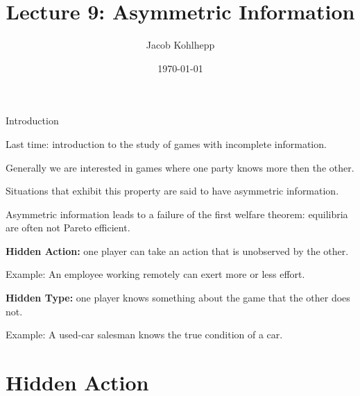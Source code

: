 \documentclass[aspectratio=169]{beamer}
\title[Asymmetric]{Lecture 9: Asymmetric Information} %
\author{Jacob Kohlhepp} %
\institute[UCLA] %
{
Econ 101 \\ %
\medskip
}
\date{\today} %
\newenvironment{wideitemize}{\itemize\addtolength{\itemsep}{10pt}}{\enditemize}
\begin{document}
\begin{frame}
\titlepage %
\end{frame}

\begin{frame}{Introduction}
\begin{wideitemize}
    \item Last time: introduction to the study of games with incomplete information.
    \item Generally we are interested in games where one party knows more then the other.
    \item Situations that exhibit this property are said to have asymmetric information.
    \item Asymmetric information leads to a failure of the first welfare theorem: equilibria are often not Pareto efficient.
    \item \textbf{Hidden Action: } one player can take an action that is unobserved by the other.
    \begin{wideitemize}
        \item Example: An employee working remotely can exert more or less effort.
    \end{wideitemize}
    \item \textbf{Hidden Type:} one player knows something about the game that the other does not.
    \begin{wideitemize}
        \item Example: A used-car salesman knows the true condition of a car.
    \end{wideitemize}
\end{wideitemize}
\end{frame}

\section{Hidden Action}
\end{document}
